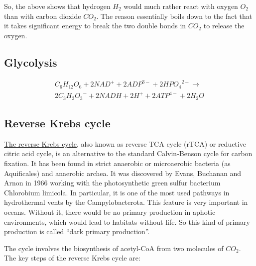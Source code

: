 \documentclass{article}
\begin{document}
So, the above shows that hydrogen $H_2$ would much rather react with oxygen $O_2$ than
with carbon dioxide $CO_2$. The reason essentially boils down to the fact that it takes
significant energy to break the two double bonds in $CO_2$ to release the oxygen.

\subsection{Glycolysis}
\[
    \begin{split}
    C_6H_{12}O_6 + 2{NAD}^+ + 2{ADP}^{3-} + 2{HPO_4}^{2-} \rightarrow \\
    2{C_3H_3O_3}^- + 2NADH + 2H^+ + 2{ATP}^{4-} + 2H_2O
    \end{split}
\]

\subsection{Reverse Krebs cycle}
\href{https://en.wikipedia.org/wiki/Biological_carbon_fixation}{The reverse Krebs cycle},
also known as reverse TCA cycle (rTCA) or reductive citric acid
cycle, is an alternative to the standard Calvin-Benson cycle for carbon fixation. It has
been found in strict anaerobic or microaerobic bacteria (as Aquificales) and anaerobic
archea. It was discovered by Evans, Buchanan and Arnon in 1966 working with the
photosynthetic green sulfur bacterium Chlorobium limicola. In particular, it is one of
the most used pathways in hydrothermal vents by the Campylobacterota. This feature is
very important in oceans. Without it, there would be no primary production in aphotic
environments, which would lead to habitats without life. So this kind of primary
production is called ``dark primary production''.

The cycle involves the biosynthesis of acetyl-CoA from two molecules of $CO_2$. The key
steps of the reverse Krebs cycle are:
\end{document}
